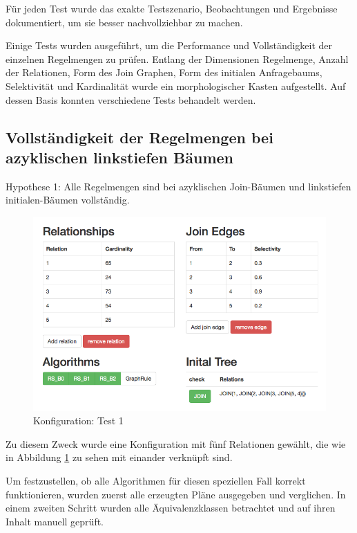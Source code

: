 Für jeden Test wurde das exakte Testszenario, Beobachtungen und Ergebnisse dokumentiert, um sie besser nachvollziehbar zu machen.









Einige Tests wurden ausgeführt, um die Performance und Vollständigkeit der einzelnen Regelmengen zu prüfen. Entlang der Dimensionen Regelmenge, Anzahl der Relationen, Form des Join Graphen, Form des initialen Anfragebaums, Selektivität und Kardinalität wurde ein morphologischer Kasten aufgestellt. Auf dessen Basis konnten verschiedene Tests behandelt werden. 

\subsection{Vollständigkeit der Regelmengen bei azyklischen linkstiefen Bäumen }

Hypothese 1: Alle Regelmengen sind bei azyklischen Join-Bäumen und linkstiefen initialen-Bäumen vollständig.

\begin{figure}[ht]
  \centering
  \includegraphics[width=\textwidth]{05_ResultsEvaluation/00_media/Test1.png}
  \caption{Konfiguration: Test 1}
  \label{Konfiguration:Test1}
\end{figure}

Zu diesem Zweck wurde eine Konfiguration mit fünf Relationen gewählt, die wie in Abbildung \ref{Konfiguration:Test1} zu sehen mit einander verknüpft sind.

Um festzustellen, ob alle Algorithmen für diesen speziellen Fall korrekt funktionieren, wurden zuerst alle erzeugten Pläne ausgegeben und verglichen. In einem zweiten Schritt wurden alle Äquivalenzklassen betrachtet und auf ihren Inhalt manuell geprüft.




